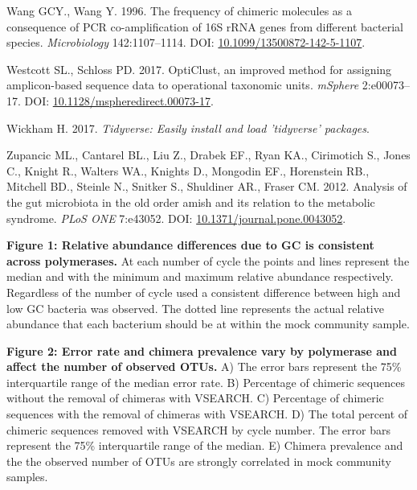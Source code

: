 \documentclass[11pt,]{article}
\begin{document}
\hypertarget{ref-Wang1996}{}
Wang GCY., Wang Y. 1996. The frequency of chimeric molecules as a
consequence of PCR co-amplification of 16S rRNA genes from different
bacterial species. \emph{Microbiology} 142:1107--1114. DOI:
\href{https://doi.org/10.1099/13500872-142-5-1107}{10.1099/13500872-142-5-1107}.

\hypertarget{ref-opticlust_Westcott_2017}{}
Westcott SL., Schloss PD. 2017. OptiClust, an improved method for
assigning amplicon-based sequence data to operational taxonomic units.
\emph{mSphere} 2:e00073--17. DOI:
\href{https://doi.org/10.1128/mspheredirect.00073-17}{10.1128/mspheredirect.00073-17}.

\hypertarget{ref-tidyverse_2017}{}
Wickham H. 2017. \emph{Tidyverse: Easily install and load 'tidyverse'
packages}.

\hypertarget{ref-Zupancic2012}{}
Zupancic ML., Cantarel BL., Liu Z., Drabek EF., Ryan KA., Cirimotich S.,
Jones C., Knight R., Walters WA., Knights D., Mongodin EF., Horenstein
RB., Mitchell BD., Steinle N., Snitker S., Shuldiner AR., Fraser CM.
2012. Analysis of the gut microbiota in the old order amish and its
relation to the metabolic syndrome. \emph{PLoS ONE} 7:e43052. DOI:
\href{https://doi.org/10.1371/journal.pone.0043052}{10.1371/journal.pone.0043052}.

\newpage

\textbf{Figure 1: Relative abundance differences due to GC is consistent
across polymerases.} At each number of cycle the points and lines
represent the median and with the minimum and maximum relative abundance
respectively. Regardless of the number of cycle used a consistent
difference between high and low GC bacteria was observed. The dotted
line represents the actual relative abundance that each bacterium should
be at within the mock community sample.

\textbf{Figure 2: Error rate and chimera prevalence vary by polymerase
and affect the number of observed OTUs.} A) The error bars represent the
75\% interquartile range of the median error rate. B) Percentage of
chimeric sequences without the removal of chimeras with VSEARCH. C)
Percentage of chimeric sequences with the removal of chimeras with
VSEARCH. D) The total percent of chimeric sequences removed with VSEARCH
by cycle number. The error bars represent the 75\% interquartile range
of the median. E) Chimera prevalence and the the observed number of OTUs
are strongly correlated in mock community samples.
\end{document}
